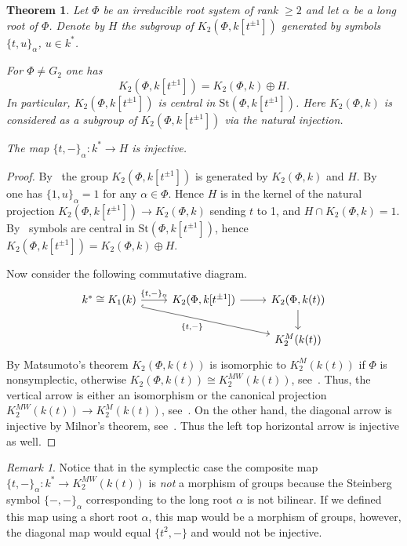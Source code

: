 \documentclass[oneside,12pt]{amsart}
\newtheorem{thm}{Theorem}
\numberwithin{equation}{section}
\numberwithin{lem}{section}
\theoremstyle{definition}
\theoremstyle{remark}
\newtheorem{rem}[lem]{Remark}
\newcommand{\Stb}{\mathrm{St}}
\begin{document}
\begin{thm}\label{thm:k[t+-1]}
Let $\Phi$ be an irreducible root system of rank $\geq 2$ and let $\alpha$ be a long root of $\Phi$.
Denote by $H$ the subgroup of $K_2(\Phi, k[t^{\pm 1}])$ generated by symbols $\{t,u\}_\alpha$, $u\in k^*$.
\begin{thmlist}
 \item For $\Phi\neq G_2$ one has
 \[K_2(\Phi,k[t^{\pm 1}])=K_2(\Phi,k)\oplus H.\]
 In particular, $K_2(\Phi,k[t^{\pm 1}])$ is central in $\Stb(\Phi,k[t^{\pm 1}])$.
 Here $K_2(\Phi,k)$ is considered as a subgroup of $K_2(\Phi,k[t^{\pm 1}])$ via the natural injection.
 \item The map $\{t, -\}_\alpha \colon k^* \to H$ is injective.
\end{thmlist}

\end{thm}
\begin{proof}
By~\cite[Korollar 4]{Hur77} the group $K_2(\Phi,k[t^{\pm 1}])$ is generated by $K_2(\Phi,k)$ and
$H$. By~\cite[Prop. 1.1 (S1)]{Ste73} one has $\{1,u\}_\alpha=1$
for any $\alpha\in\Phi$. Hence $H$ is in the kernel of the natural projection $K_2(\Phi,k[t^{\pm 1}])\to K_2(\Phi,k)$
sending $t$ to 1, and $H\cap K_2(\Phi,k)=1$. By~\cite[Prop. 1.3 (a)]{Ste73} symbols are central in
$\Stb(\Phi,k[t^{\pm 1}])$, hence $K_2(\Phi,k[t^{\pm 1}])=K_2(\Phi,k)\oplus H$.

Now consider the following commutative diagram.
\[\begin{tikzcd} k^* \cong K_1(k) \ar[r, "{\{t, -\}_\alpha}"] \ar[hookrightarrow, rrd, "{\{t,-\}}"'] & K_2(\Phi, k[t^{\pm 1}]) \ar[r] & K_2(\Phi, k(t))\ar[d] \\
                                                                               &                                 & K_2^M(k(t)) \end{tikzcd}\]
By Matsumoto's theorem $K_2(\Phi, k(t))$ is isomorphic to $K_2^M(k(t))$ if $\Phi$ is nonsymplectic, otherwise $K_2(\Phi, k(t))\cong K_2^{MW}(k(t))$, see~\cite[Corollaire~5.11]{Ma69}.
Thus, the vertical arrow is either an isomorphism or the canonical projection $K_2^{MW}(k(t))\to K_2^M(k(t))$, see~\cite[\S~6]{Sus87}.
On the other hand, the diagonal arrow is injective by Milnor's theorem, see~\cite[\S~2]{Mil70}. Thus the left top horizontal arrow is injective as well.
\end{proof}

\begin{rem} Notice that in the symplectic case the composite map $\{t, -\}_\alpha\colon k^*\to K_2^{MW}(k(t))$ is \emph{not} a morphism of groups
because the Steinberg symbol $\{-, -\}_\alpha$ corresponding to the long root $\alpha$ is not bilinear.
If we defined this map using a short root $\alpha$, this map would be a morphism of groups, 
however, the diagonal map would equal $\{t^2,-\}$ and would not be injective. \end{rem}
\end{document}
